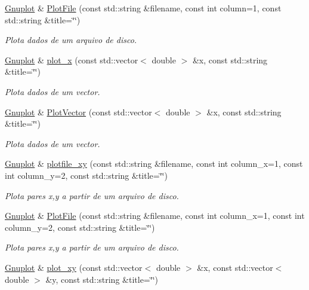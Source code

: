 \begin{DoxyCompactItemize}
\hyperlink{class_gnuplot}{Gnuplot} \& \hyperlink{class_gnuplot_a12ba90a46e80421f655049cb1d1d835d}{Plot\+File} (const std\+::string \&filename, const int column=1, const std\+::string \&title=\char`\"{}\char`\"{})
\begin{DoxyCompactList}\small\item\em Plota dados de um arquivo de disco. \end{DoxyCompactList}\item 
\hyperlink{class_gnuplot}{Gnuplot} \& \hyperlink{class_gnuplot_a9400d43204b9df62851c063aee604f0d}{plot\+\_\+x} (const std\+::vector$<$ double $>$ \&x, const std\+::string \&title=\char`\"{}\char`\"{})
\begin{DoxyCompactList}\small\item\em Plota dados de um vector. \end{DoxyCompactList}\item 
\hyperlink{class_gnuplot}{Gnuplot} \& \hyperlink{class_gnuplot_ab478d91039848a22733fc7a0f7c25f04}{Plot\+Vector} (const std\+::vector$<$ double $>$ \&x, const std\+::string \&title=\char`\"{}\char`\"{})
\begin{DoxyCompactList}\small\item\em Plota dados de um vector. \end{DoxyCompactList}\item 
\hyperlink{class_gnuplot}{Gnuplot} \& \hyperlink{class_gnuplot_af226f395310d3c5c4f8b4d2aaf5d8823}{plotfile\+\_\+xy} (const std\+::string \&filename, const int column\+\_\+x=1, const int column\+\_\+y=2, const std\+::string \&title=\char`\"{}\char`\"{})
\begin{DoxyCompactList}\small\item\em Plota pares x,y a partir de um arquivo de disco. \end{DoxyCompactList}\item 
\hyperlink{class_gnuplot}{Gnuplot} \& \hyperlink{class_gnuplot_a68d5b282f0fc0d65d432009b55705cbd}{Plot\+File} (const std\+::string \&filename, const int column\+\_\+x=1, const int column\+\_\+y=2, const std\+::string \&title=\char`\"{}\char`\"{})
\begin{DoxyCompactList}\small\item\em Plota pares x,y a partir de um arquivo de disco. \end{DoxyCompactList}\item 
\hyperlink{class_gnuplot}{Gnuplot} \& \hyperlink{class_gnuplot_a777b6a5474951d6d023dff4237d80a2b}{plot\+\_\+xy} (const std\+::vector$<$ double $>$ \&x, const std\+::vector$<$ double $>$ \&y, const std\+::string \&title=\char`\"{}\char`\"{})

\end{DoxyCompactItemize}
